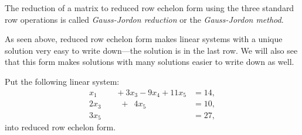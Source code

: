 \begin{definition}
The reduction of a matrix to reduced row echelon form using the three standard row operations is called \emph{Gauss-Jordon reduction} or the \emph{Gauss-Jordon method}.
\end{definition}



As seen above, reduced row echelon form makes linear systems with a unique solution very easy to write down---the solution is in the last row.  We will also see that this form makes solutions with many solutions easier to write down as well.

\begin{example}
Put the following linear system:
\begin{align*}
x_1\phantom{+2x_3} + 3x_3 -9 x_4 + 11 x_5 & = 14, \\
2x_3 \phantom{-9x_4} +\phantom{1} 4x_5 & = 10, \\
3x_5 & = 27,
\end{align*}
into reduced row echelon form.

\solution


\end{example}
